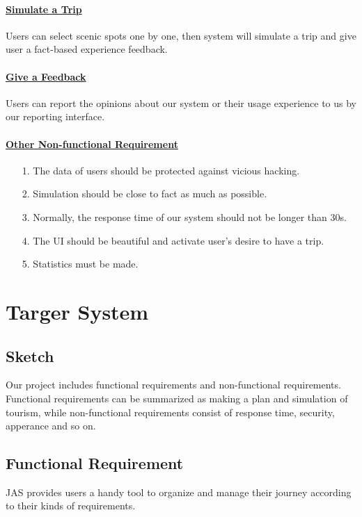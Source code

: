 \documentclass[10pt]{article}
\begin{document}
\paragraph{\underline{Simulate a Trip}} Users can select scenic spots one by one, then system will simulate a trip and give user a fact-based experience feedback.

\paragraph{\underline{Give a Feedback}} Users can report the opinions about our system or their usage experience to us by our reporting interface.

\paragraph{\underline{Other Non-functional Requirement}}
\begin{itemize}
	\item[1.] The data of users should be protected against vicious hacking.
	\item[2.]	Simulation should be close to fact as much as possible.
	\item[3.]	Normally, the response time of our system should not be longer than 30s.
	\item[4.]	The UI should be beautiful and activate user’s desire to have a trip.
	\item[5.]	Statistics must be made.
	
\end{itemize}

\section{Targer System}
\subsection{Sketch}
Our project includes functional requirements and non-functional requirements. Functional requirements can be summarized as making a plan and simulation of tourism, while non-functional requirements consist of response time, security, apperance and so on.

\subsection{Functional Requirement}
JAS provides users a handy tool to organize and manage their journey according to their kinds of requirements. 
\end{document}
